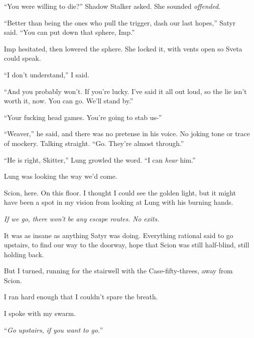 ``You were willing to die?''  Shadow Stalker asked.  She sounded \emph{offended}.



``Better than being the ones who pull the trigger, dash our last hopes,'' Satyr said.  ``You can put down that sphere, Imp.''



Imp hesitated, then lowered the sphere.  She locked it, with vents open so Sveta could speak.



``I don't understand,'' I said.



``And you probably won't.  If you're lucky.  I've said it all out loud, so the lie isn't worth it, now.  You can go.  We'll stand by.''



``Your fucking head games.  You're going to stab us-''



``Weaver,'' he said, and there was no pretense in his voice.  No joking tone or trace of mockery.  Talking straight.  ``Go.  They're almost through.''



``He is right, Skitter,'' Lung growled the word.  ``I can \emph{hear} him.''



Lung was looking the way we'd come.



Scion, here.  On this floor.  I thought I could see the golden light, but it might have been a spot in my vision from looking at Lung with his burning hands.



\emph{If we go, there won't be any escape routes.  No exits.}



It was as insane as anything Satyr was doing.  Everything rational said to go upstairs, to find our way to the doorway, hope that Scion was still half-blind, still holding back.



But I turned, running for the stairwell with the Case-fifty-threes, away from Scion.



I ran hard enough that I couldn't spare the breath.



I spoke with my swarm.



``\emph{Go upstairs, if you want to go.}''




